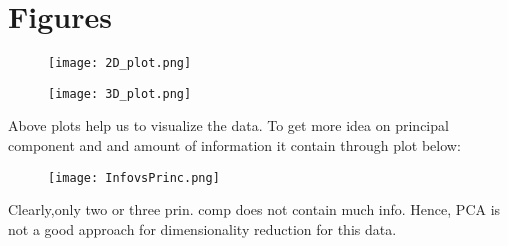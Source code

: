 \documentclass[journal,12pt,twocolumn]{IEEEtran}
\begin{document}
\section{Figures}
\begin{figure}[!h]
\begin{center}
\texttt{[image: 2D\_plot.png]}
\end{center}
\caption{}
\label{fig: 2D Plot}
\end{figure}

\begin{figure}[!h]
\begin{center}
\texttt{[image: 3D\_plot.png]}
\end{center}
\caption{}
\label{fig: 3D Plot}
\end{figure}

Above plots help us to visualize the data. To get more idea on principal component and and amount of information it contain through plot below:

\begin{figure}[!h]
\begin{center}
\texttt{[image: InfovsPrinc.png]}
\end{center}
\caption{}
\label{fig: }
\end{figure}  

Clearly,only two or three prin. comp does not contain much info. Hence, PCA is not a good approach for dimensionality reduction for this data.
\end{document}

